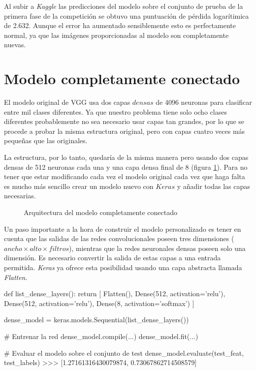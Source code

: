 Al subir a \textit{Kaggle} las predicciones del modelo sobre el conjunto de
prueba de la primera fase de la competición se obtuvo una puntuación de pérdida
logarítimica de 2.632. Aunque el error ha aumentado sensiblemente esto es
perfectamente normal, ya que las imágenes proporcionadas al modelo son
completamente nuevas.

\section{Modelo completamente conectado}
\label{sec:model_connected}

El modelo original de VGG usa dos capas $densas$ de 4096 neuronas para
clasificar entre mil clases diferentes. Ya que nuestro problema tiene solo ocho
clases diferentes probablemente no sea necesario usar capas tan grandes, por lo
que se procede a probar la misma estructura original, pero con capas cuatro
veces más pequeñas que las originales.

La estructura, por lo tanto, quedaría de la misma manera pero usando dos capas
densas de 512 neuronas cada una y una capa densa final de 8 (figura
\ref{standard_arch}). Para no tener que estar modificando cada vez el modelo
original cada vez que haga falta es mucho más sencillo crear un modelo nuevo
con $Keras$ y añadir todas las capas necesarias.

\begin{figure}
  \caption{Arquitectura del modelo completamente conectado}
\label{standard_arch}
\end{figure}

Un paso importante a la hora de construir el modelo personalizado es tener en cuenta que las salidas de las redes convolucionales poseen tres dimensiones ($ancho \times alto \times filtros$), mientras que la redes neuronales densas poseen solo una dimensión. Es necesario convertir la salida de estas capas a una entrada permitida. \textit{Keras} ya ofrece esta posibilidad usando una capa abstracta llamada \textit{Flatten}.

\begin{python}
def list_dense_layers():
    return [
        Flatten(),
        Dense(512, activation='relu'),
        Dense(512, activation='relu'),
        Dense(8, activation='softmax')
    ]

dense_model = keras.models.Sequential(list_dense_layers())

# Entrenar la red
dense_model.compile(...)
dense_model.fit(...)

# Evaluar el modelo sobre el conjunto de test
dense_model.evaluate(test_feat, test_labels)
>>> [1.27161316430079874, 0.73067862714508579]
\end{python}

